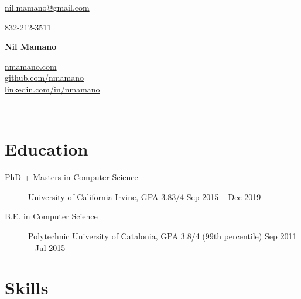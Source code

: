 \documentclass[letterpaper,10pt,oneside]{article}
\begin{document}
{\raggedleft

\begin{minipage}[c]{0.28\textwidth}
	\begin{flushleft}
	\href{mailto:nil.mamano@gmail.com}{nil.mamano@gmail.com}\\
\begin{comment}
	1710 Dunlavy St\\
	Houston, Texas 77006, US\\
\end{comment}
	832-212-3511
	\end{flushleft}
\end{minipage}\hfill
\begin{minipage}[c]{0.3\textwidth}
	\begin{center}
		\Huge{\textbf{Nil Mamano}}
	\end{center}
\end{minipage}\hfill
\begin{minipage}[c]{0.3\textwidth}
	\begin{flushright}
	\href{http://www.nmamano.com}{nmamano.com} \\
	\href{http://www.github.com/nmamano}{github.com/nmamano} \\
	\href{http://www.linkedin.com/in/nmamano}{linkedin.com/in/nmamano}
	\end{flushright}
\end{minipage}\\
\vspace{5px}
\hrulefill
}
\vspace{-5px}

\section*{Education}
\begin{description}
\item[PhD + Masters in Computer Science]\quad University of California Irvine, GPA 3.83/4 \hfill Sep 2015 -- Dec 2019
\item[B.E. in Computer Science]\quad Polytechnic University of Catalonia, GPA 3.8/4 (99th percentile) \hfill Sep 2011 -- Jul 2015
\end{description}
\section*{Skills}
\end{document}
